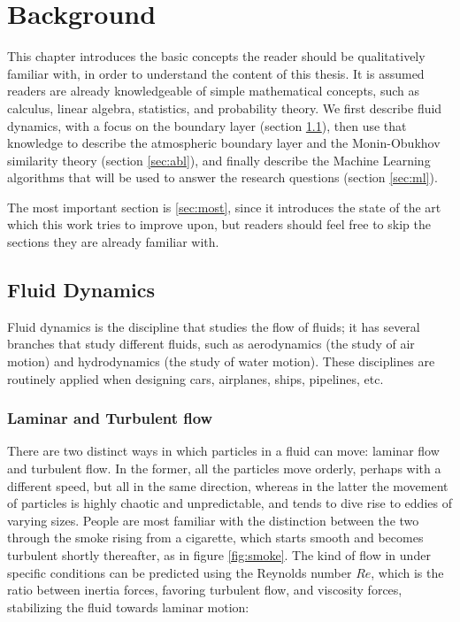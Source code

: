 \documentclass[a4paper,11pt]{kth-mag}
\begin{document}
\chapter{Background}
\label{ch:background}
This chapter introduces the basic concepts the reader should be qualitatively familiar with, in order to understand the content of this thesis. It is assumed readers are already knowledgeable of simple mathematical concepts, such as calculus, linear algebra, statistics, and probability theory. We first describe fluid dynamics, with a focus on the boundary layer (section \ref{sec:fluids}), then use that knowledge to describe the atmospheric boundary layer and the Monin-Obukhov similarity theory (section \ref{sec:abl}), and finally describe the Machine Learning algorithms that will be used to answer the research questions (section \ref{sec:ml}). 

The most important section is \ref{sec:most}, since it introduces the state of the art which this work tries to improve upon, but readers should feel free to skip the sections they are already familiar with.

\section{Fluid Dynamics}
\label{sec:fluids}
Fluid dynamics is the discipline that studies the flow of fluids; it has several branches that study different fluids, such as aerodynamics (the study of air motion) and hydrodynamics (the study of water motion). These disciplines are routinely applied when designing cars, airplanes, ships, pipelines, etc.

\subsection{Laminar and Turbulent flow}
There are two distinct ways in which particles in a fluid can move: laminar flow and turbulent flow. In the former, all the particles move orderly, perhaps with a different speed, but all in the same direction, whereas in the latter the movement of particles is highly chaotic and unpredictable, and tends to dive rise to eddies of varying sizes. People are most familiar with the distinction between the two through the smoke rising from a cigarette, which starts smooth and becomes turbulent shortly thereafter, as in figure \ref{fig:smoke}. The kind of flow in under specific conditions can be predicted using the Reynolds number $Re$, which is the ratio between inertia forces, favoring turbulent flow, and viscosity forces, stabilizing the fluid towards laminar motion:
\end{document}
